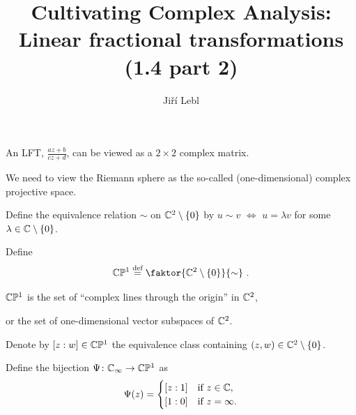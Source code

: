 \documentclass[10pt,aspectratio=169]{beamer}
\author{Ji\v{r}\'i Lebl}
\institute[OSU]{%
Departemento pri Matematiko de Oklahoma {\^S}tata Universitato}
\title{Cultivating Complex Analysis:\\%
Linear fractional transformations (1.4 part 2)}
\date{}
\begin{document}
\begin{frame}
\titlepage
\end{frame}

\begin{frame}
An LFT, $\frac{a z + b}{c z + d}$, can be viewed as a $2 \times 2$ complex matrix.

\medskip
\pause

We need to view the Riemann sphere as the so-called (one-dimensional)
complex projective space.

\medskip
\pause

Define the equivalence relation $\sim$ on ${\mathbb{C}}^2 \setminus \{ 0 \}$ by
$u \sim v$ $\Leftrightarrow$ $u = \lambda v$ for some $\lambda \in {\mathbb{C}}
\setminus \{ 0 \}$.

Define
\[
\C \bP^1
\overset{\text{def}}{=}
\faktor{\C^2 \setminus \{ 0\}}{\sim} \ .
\]

\pause

${\mathbb{C}} {\mathbb{P}}^1$ is the set of ``complex lines through the
origin'' in ${\mathbb{C}}^2$,

or the set of one-dimensional vector subspaces of ${\mathbb{C}}^2$.

\medskip
\pause

Denote by $[z:w] \in {\mathbb{C}} {\mathbb{P}}^1$ the equivalence class containing
$(z,w) \in {\mathbb{C}}^2 \setminus \{0\}$.

\medskip
\pause

Define the bijection $\Psi \colon {\mathbb{C}}_\infty \to {\mathbb{C}} {\mathbb{P}}^1$ as
\begin{equation*}
\Psi(z) =
\begin{cases}
[z:1] & \text{if } z \in {\mathbb{C}} , \\
[1:0] & \text{if } z=\infty .
\end{cases}
\end{equation*}

\end{frame}
\end{document}
